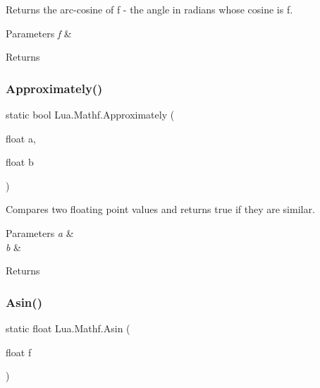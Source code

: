 Returns the arc-\/cosine of f -\/ the angle in radians whose cosine is f. 


\begin{DoxyParams}{Parameters}
{\em f} & \\
\hline
\end{DoxyParams}
\begin{DoxyReturn}{Returns}

\end{DoxyReturn}
\mbox{\label{class_lua_1_1_mathf_a2a53d9e05a8d05eaa05d1fced26906e6}} 
\subsubsection{\texorpdfstring{Approximately()}{Approximately()}}
{\footnotesize\ttfamily static bool Lua.\+Mathf.\+Approximately (\begin{DoxyParamCaption}\item[{float}]{a,  }\item[{float}]{b }\end{DoxyParamCaption})\hspace{0.3cm}{\ttfamily [static]}}



Compares two floating point values and returns true if they are similar. 


\begin{DoxyParams}{Parameters}
{\em a} & \\
\hline
{\em b} & \\
\hline
\end{DoxyParams}
\begin{DoxyReturn}{Returns}

\end{DoxyReturn}
\mbox{\label{class_lua_1_1_mathf_a85731b3f55f246a46df2a2f40bc87ae7}} 
\subsubsection{\texorpdfstring{Asin()}{Asin()}}
{\footnotesize\ttfamily static float Lua.\+Mathf.\+Asin (\begin{DoxyParamCaption}\item[{float}]{f }\end{DoxyParamCaption})\hspace{0.3cm}{\ttfamily [static]}}



